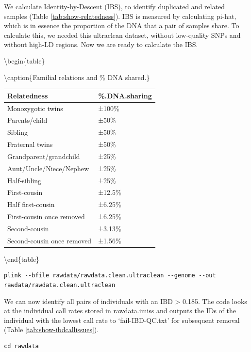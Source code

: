 \documentclass[
]{book}
\begin{document}
We calculate Identity-by-Descent (IBS), to identify duplicated and related samples (Table \ref{tab:show-relatedness}). IBS is measured by calculating pi-hat, which is in essence the proportion of the DNA that a pair of samples share. To calculate this, we needed this ultraclean dataset, without low-quality SNPs and without high-LD regions. Now we are ready to calculate the IBS.

\textbackslash begin\{table\}

\textbackslash caption\{\label{tab:show-relatedness}Familial relations and \% DNA shared.\}
\centering

\begin{tabular}[t]{l|l}
\hline
Relatedness & \%.DNA.sharing\\
\hline
Monozygotic twins & ±100\%\\
\hline
Parents/child & ±50\%\\
\hline
Sibling & ±50\%\\
\hline
Fraternal twins & ±50\%\\
\hline
Grandparent/grandchild & ±25\%\\
\hline
Aunt/Uncle/Niece/Nephew & ±25\%\\
\hline
Half-sibling & ±25\%\\
\hline
First-cousin & ±12.5\%\\
\hline
Half first-cousin & ±6.25\%\\
\hline
First-cousin once removed & ±6.25\%\\
\hline
Second-cousin & ±3.13\%\\
\hline
Second-cousin once removed & ±1.56\%\\
\hline
\end{tabular}

\textbackslash end\{table\}

\begin{verbatim}
plink --bfile rawdata/rawdata.clean.ultraclean --genome --out rawdata/rawdata.clean.ultraclean
\end{verbatim}

We can now identify all pairs of individuals with an IBD \textgreater{} 0.185. The code looks at the individual call rates stored in rawdata.imiss and outputs the IDs of the individual with the lowest call rate to `fail-IBD-QC.txt' for subsequent removal (Table \ref{tab:show-ibdcallissues}).

\begin{verbatim}
cd rawdata
\end{verbatim}
\end{document}
